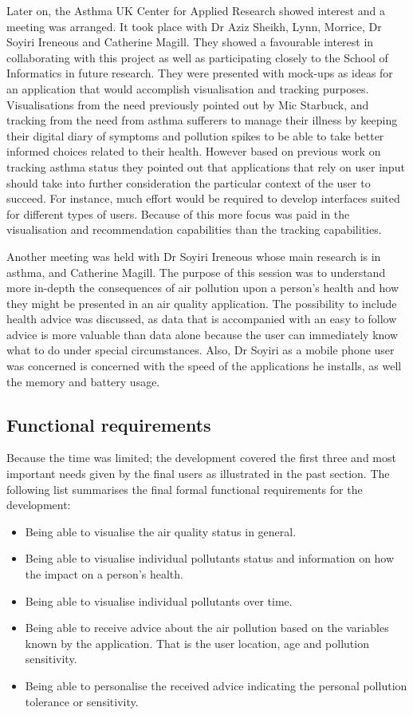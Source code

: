 Later on, the Asthma UK Center for Applied Research showed interest and a meeting was arranged. It took place with Dr Aziz Sheikh, Lynn, Morrice, Dr Soyiri Ireneous and Catherine Magill. They showed a favourable interest in collaborating with this project as well as participating closely to the School of Informatics in future research. They were presented with mock-ups as ideas for an application that would accomplish visualisation and tracking purposes. Visualisations from the need previously pointed out by Mic Starbuck, and tracking from the need from asthma sufferers to manage their illness by keeping their digital diary of symptoms and pollution spikes to be able to take better informed choices related to their health. However based on previous work on tracking asthma status they pointed out that applications that rely on user input should take into further consideration the particular context of the user to succeed. For instance, much effort would be required to develop interfaces suited for different types of users. Because of this more focus was paid in the visualisation and recommendation capabilities than the tracking capabilities.

Another meeting was held with Dr Soyiri Ireneous whose main research is in asthma, and Catherine Magill. The purpose of this session was to understand more in-depth the consequences of air pollution upon a person's health and how they might be presented in an air quality application. The possibility to include health advice was discussed, as data that is accompanied with an easy to follow advice is more valuable than data alone because the user can immediately know what to do under special circumstances. Also, Dr Soyiri as a mobile phone user was concerned is concerned with the speed of the applications he installs, as well the memory and battery usage.

\subsection{Functional requirements}

Because the time was limited; the development covered the first three and most important needs given by the final users as illustrated in the past section. The following list summarises the final formal functional requirements for the development:

\begin{itemize}
    \item Being able to visualise the air quality status in general.
    \item Being able to visualise individual pollutants status and information on how the impact on a person's health.
    \item Being able to visualise individual pollutants over time.
    \item Being able to receive advice about the air pollution based on the variables known by the application. That is the user location, age and pollution sensitivity. 
    \item Being able to personalise the received advice indicating the personal pollution tolerance or sensitivity.
\end{itemize}

